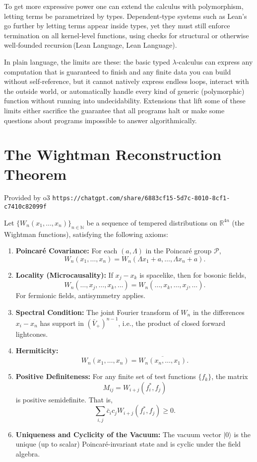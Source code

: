 \documentclass{article}
\newcommand{\1}{\mathbbm{1}}
\theoremstyle{plain}
\theoremstyle{definition}
\numberwithin{equation}{section}
\begin{document}
To get more expressive power one can extend the calculus with polymorphism, letting terms be parametrized by types. Dependent‑type systems such as Lean’s go further by letting terms appear inside types, yet they must still enforce termination on all kernel‑level functions, using checks for structural or otherwise well‑founded recursion (Lean Language, Lean Language).

In plain language, the limits are these: the basic typed $\lambda$‑calculus can express any computation that is guaranteed to finish and any finite data you can build without self‑reference, but it cannot natively express endless loops, interact with the outside world, or automatically handle every kind of generic (polymorphic) function without running into undecidability. Extensions that lift some of these limits either sacrifice the guarantee that all programs halt or make some questions about programs impossible to answer algorithmically.


\section{The Wightman Reconstruction Theorem}
\label{s:wrt2}

Provided by o3 {\tt https://chatgpt.com/share/6883cf15-5d7c-8010-8cf1-c7410c82099f}

Let $\{ W_n(x_1, \dots, x_n) \}_{n \in \mathbb{N}}$ be a sequence of tempered distributions on $\mathbb{R}^{4n}$ (the Wightman functions), satisfying the following axioms:

\begin{enumerate}
  \item \textbf{Poincaré Covariance:} For each $(a, \Lambda)$ in the Poincaré group $\mathcal{P}$,
  \[
  W_n(x_1, \dots, x_n) = W_n(\Lambda x_1 + a, \dots, \Lambda x_n + a).
  \]
  
  \item \textbf{Locality (Microcausality):} If $x_j - x_k$ is spacelike, then for bosonic fields,
  \[
  W_n(\dots, x_j, \dots, x_k, \dots) = W_n(\dots, x_k, \dots, x_j, \dots).
  \]
  For fermionic fields, antisymmetry applies.
  
  \item \textbf{Spectral Condition:} The joint Fourier transform of $W_n$ in the differences $x_i - x_n$ has support in $(\bar{V}_+)^{n-1}$, i.e., the product of closed forward lightcones.
  
  \item \textbf{Hermiticity:} 
  \[
  W_n(x_1, \dots, x_n) = \overline{W_n(x_n, \dots, x_1)}.
  \]
  
  \item \textbf{Positive Definiteness:} For any finite set of test functions $\{ f_k \}$, the matrix
  \[
  M_{ij} = W_{i+j}(f_i^*, f_j)
  \]
  is positive semidefinite. That is,
  \[
  \sum_{i,j} \bar{c}_i c_j W_{i+j}(f_i^*, f_j) \geq 0.
  \]
  
  \item \textbf{Uniqueness and Cyclicity of the Vacuum:} The vacuum vector $|0\rangle$ is the unique (up to scalar) Poincaré-invariant state and is cyclic under the field algebra.
\end{enumerate}
\end{document}
